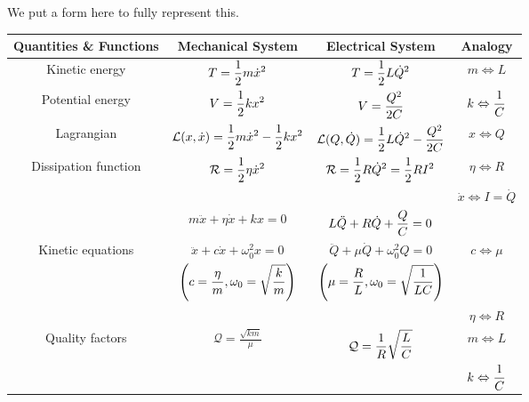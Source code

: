 We put a form here to fully represent this.

\begin{center}
    \begin{tabular}{|c|c|c|c|}
        \hline
        Quantities \& Functions & Mechanical System & Electrical System & Analogy \\
        \hline
        Kinetic energy & $\displaystyle T = {1 \over 2} m \dot{x}^2$ & $\displaystyle T = {1 \over 2} L \dot{Q}^2$ & $\displaystyle m \Leftrightarrow L$ \\
        Potential energy & $\displaystyle V = {1 \over 2} kx^2$ & $\displaystyle V = {Q^2 \over 2C}$ & $\displaystyle k \Leftrightarrow {1 \over C}$ \\
        Lagrangian & $\displaystyle \mathcal{L}(x, \dot{x}) = {1 \over 2} m \dot{x}^2 - {1 \over 2} kx^2$ & $\displaystyle \mathcal{L}(Q, \dot{Q}) = {1 \over 2} L \dot{Q}^2 - {Q^2 \over 2C}$ & $\displaystyle x \Leftrightarrow Q$ \\ \hline
        Dissipation function & $\displaystyle \mathcal{R} = {1 \over 2} \eta \dot{x}^2$ & $\displaystyle \mathcal{R} = {1 \over 2} R \dot{Q}^2 = {1 \over 2} RI^2$ & $\displaystyle \eta \Leftrightarrow R$ \\
        & & & $\displaystyle \dot{x} \Leftrightarrow I = \dot{Q}$ \\
        \hline
        & $\displaystyle m \ddot{x} + \eta \dot{x} + kx = 0$ & $\displaystyle L \ddot{Q} + R \dot{Q} + {Q \over C} = 0$ & \\
        Kinetic equations & $\displaystyle \ddot{x} + c \dot{x} + \omega_0^2 x = 0$  &  $\displaystyle \ddot{Q} + \mu \dot{Q} + \omega_0^2 Q = 0$ & $\displaystyle c \Leftrightarrow \mu$ \\
        & $\displaystyle \left( c = {\eta \over m}, \omega_0 = \sqrt{k \over m} \right)$ & $\displaystyle \left( \mu = {R \over L}, \omega_0 = \sqrt{1 \over LC} \right)$ & \\
        \hline
        & & & $\displaystyle \eta \Leftrightarrow R$ \\
        Quality factors & $\displaystyle \mathcal{Q} = \frac{\sqrt{km}}{\mu}$ & $\displaystyle \mathcal{Q} = {1 \over R} \sqrt{L \over C}$ & $\displaystyle m \Leftrightarrow L$ \\
        & & & $\displaystyle k \Leftrightarrow {1 \over C}$ \\
        \hline
        \end{tabular}
\end{center}
